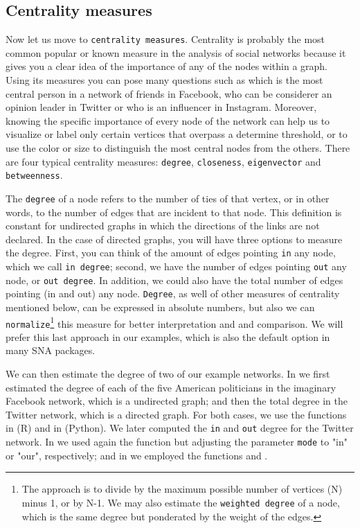 
\subsection{Centrality measures}

Now let us move to \texttt{centrality measures}. Centrality is probably the most common popular or known measure in the analysis of social networks because it gives you a clear idea of the importance of any of the nodes within a graph. Using its measures you can pose many questions such as which is the most central person in a network of friends in Facebook, who can be considerer an opinion leader in Twitter or who is an influencer in Instagram. Moreover, knowing the specific importance of every node of the network can help us to visualize or label only certain vertices that overpass a determine threshold, or to use the color or size to distinguish the most central nodes from the others. There are four typical centrality measures: \texttt{degree}, \texttt{closeness}, \texttt{eigenvector} and \texttt{betweenness}.

The \texttt{degree} of a node refers to the number of ties of that vertex, or in other words, to the number of edges that are incident to that node. This definition is constant for undirected graphs in which the directions of the links are not declared. In the case of directed graphs, you will have three options to measure the degree. First, you can think of the amount of edges pointing \texttt{in} any node, which we call \texttt{in degree}; second, we have the number of edges pointing \texttt{out} any node, or \texttt{out degree}. In addition, we could also have the total number of edges pointing (in and out) any node. \texttt{Degree}, as well of other measures of centrality mentioned below, can be expressed in absolute numbers, but also we can \texttt{normalize}\footnote{The approach is to divide by the maximum possible number of vertices (N) minus 1, or by N-1. We may also estimate the \texttt{weighted degree} of a node, which is the same degree but ponderated by the weight of the edges.}  this measure for better interpretation and and comparison. We will prefer this last approach in our examples, which is also the default option in many SNA packages.

We can then estimate the degree of two of our example networks. In  we first estimated the degree of each of the five American politicians in the imaginary Facebook network, which is a undirected graph; and then the total degree in the Twitter network, which is a directed graph. For both cases, we use the functions  in  (R) and  in  (Python). We later computed the \texttt{in} and \texttt{out} degree for the Twitter network. In  we used again the function  but adjusting the parameter \texttt{mode} to "in" or "our", respectively; and in  we employed the functions  and .


